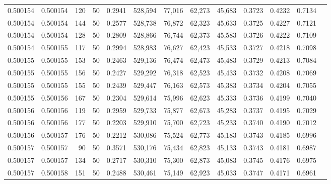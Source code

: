 \begin{tabular}{rrrrrrrrrrrrr}
0.500154 & 0.500154 &   120 &  50 &                                     0.2941 & 528,594 &  77,016 &  62,273 &  45,683 & 0.3723 & 0.4232 & 0.7134 \\
0.500154 & 0.500154 &   144 &  50 &                                     0.2577 & 528,738 &  76,872 &  62,323 &  45,633 & 0.3725 & 0.4227 & 0.7121 \\
0.500154 & 0.500154 &   128 &  50 &                                     0.2809 & 528,866 &  76,744 &  62,373 &  45,583 & 0.3726 & 0.4222 & 0.7109 \\
0.500154 & 0.500155 &   117 &  50 &                                     0.2994 & 528,983 &  76,627 &  62,423 &  45,533 & 0.3727 & 0.4218 & 0.7098 \\
0.500155 & 0.500155 &   153 &  50 &                                     0.2463 & 529,136 &  76,474 &  62,473 &  45,483 & 0.3729 & 0.4213 & 0.7084 \\
0.500155 & 0.500155 &   156 &  50 &                                     0.2427 & 529,292 &  76,318 &  62,523 &  45,433 & 0.3732 & 0.4208 & 0.7069 \\
0.500155 & 0.500155 &   155 &  50 &                                     0.2439 & 529,447 &  76,163 &  62,573 &  45,383 & 0.3734 & 0.4204 & 0.7055 \\
0.500155 & 0.500156 &   167 &  50 &                                     0.2304 & 529,614 &  75,996 &  62,623 &  45,333 & 0.3736 & 0.4199 & 0.7040 \\
0.500156 & 0.500156 &   119 &  50 &                                     0.2959 & 529,733 &  75,877 &  62,673 &  45,283 & 0.3737 & 0.4195 & 0.7029 \\
0.500156 & 0.500156 &   177 &  50 &                                     0.2203 & 529,910 &  75,700 &  62,723 &  45,233 & 0.3740 & 0.4190 & 0.7012 \\
0.500156 & 0.500157 &   176 &  50 &                                     0.2212 & 530,086 &  75,524 &  62,773 &  45,183 & 0.3743 & 0.4185 & 0.6996 \\
0.500157 & 0.500157 &    90 &  50 &                                     0.3571 & 530,176 &  75,434 &  62,823 &  45,133 & 0.3743 & 0.4181 & 0.6987 \\
0.500157 & 0.500157 &   134 &  50 &                                     0.2717 & 530,310 &  75,300 &  62,873 &  45,083 & 0.3745 & 0.4176 & 0.6975 \\
0.500157 & 0.500158 &   151 &  50 &                                     0.2488 & 530,461 &  75,149 &  62,923 &  45,033 & 0.3747 & 0.4171 & 0.6961 \\

\end{tabular}
